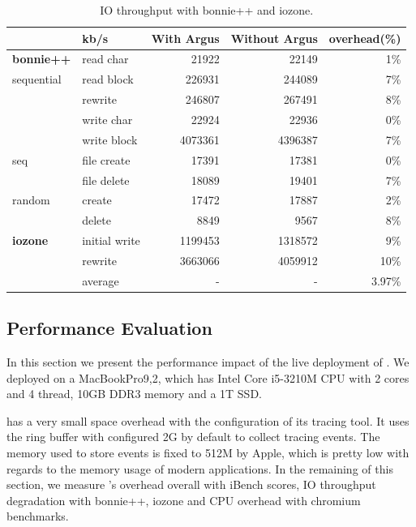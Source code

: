 \begin{table}[tb]
\footnotesize
\centering
\begin{tabular}{ll|rrr}
\hline
 & kb/s & With Argus & Without Argus & overhead(\%)\\
 \hline\hline
\textbf{bonnie++}&read char & 21922 & 22149 & 1\%\\
 sequential& read block & 226931 & 244089 & 7\%\\
 & rewrite & 246807 & 267491 & 8\%\\
 & write char & 22924 & 22936 & 0\%\\
 & write block & 4073361 & 4396387 & 7\%\\
 \hline
 seq& file create & 17391 & 17381 & 0\%\\
 & file delete & 18089 & 19401 & 7\%\\
 \hline
 random& create & 17472 & 17887 & 2\%\\
 & delete & 8849 & 9567 & 8\%\\
 \hline
 \hline
\textbf{iozone} & initial write & 1199453 & 1318572 & 9\%\\
 & rewrite & 3663066 & 4059912 & 10\%\\
 \hline
 & average & - & - & 3.97\%\\
\hline
\end{tabular}
\caption{IO throughput with bonnie++ and iozone.}
\label{tab:iothroughput}
\vspace{-0.5cm}
\end{table}


\subsection{Performance Evaluation}\label{sec:evaluation}

In this section we present the performance impact of the live deployment of
\xxx. We deployed \xxx on a MacBookPro9,2, which has Intel Core i5-3210M CPU with
2 cores and 4 thread, 10GB DDR3 memory and a 1T SSD.

\xxx has a very small space overhead with the configuration of its tracing
tool. It uses the ring buffer with configured 2G by default to collect tracing
events. The memory used to store events is fixed to 512M by Apple, which is pretty
low with regards to the memory usage of modern applications. In the remaining
of this section, we measure \xxx's overhead overall with iBench scores, IO
throughput degradation with bonnie++, iozone and CPU overhead with chromium
benchmarks.

